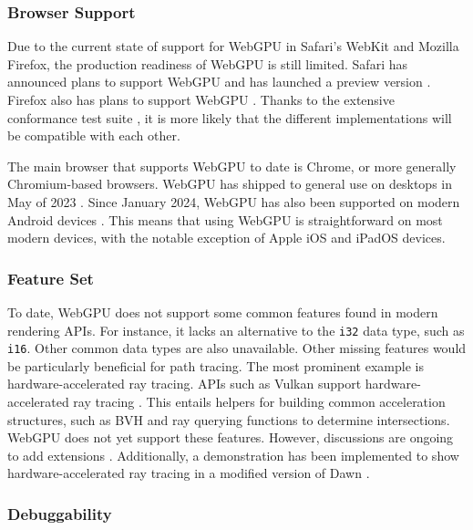 \subsubsection*{Browser Support}

Due to the current state of support for \gls{WebGPU} in Safari's \gls{WebKit} and Mozilla Firefox, the production readiness of \gls{WebGPU} is still limited. Safari has announced plans to support \gls{WebGPU} and has launched a preview version \cite{SafariWebGPUSupport}. Firefox also has plans to support \gls{WebGPU} \cite{FirefoxWebGPUSupport}. Thanks to the extensive conformance test suite \cite{WebGPUConformanceTestSuite}, it is more likely that the different implementations will be compatible with each other.

The main browser that supports \gls{WebGPU} to date is Chrome, or more generally \gls{Chromium}-based browsers. \gls{WebGPU} has shipped to general use on desktops in May of 2023 \cite{ChromeWebGPUSupport}. Since January 2024, \gls{WebGPU} has also been supported on modern Android devices \cite{ChromeAndroidWebGPUSupport}. This means that using \gls{WebGPU} is straightforward on most modern devices, with the notable exception of Apple iOS and iPadOS devices.

\subsubsection*{Feature Set}

To date, \gls{WebGPU} does not support some common features found in modern rendering \glspl{API}. For instance, it lacks an alternative to the \texttt{i32} data type, such as \texttt{i16}. Other common data types are also unavailable. Other missing features would be particularly beneficial for path tracing. The most prominent example is hardware-accelerated ray tracing. \glspl{API} such as \gls{Vulkan} support hardware-accelerated ray tracing \cite{vulkanRayTracing}. This entails helpers for building common acceleration structures, such as \gls{BVH} and ray querying functions to determine intersections. \gls{WebGPU} does not yet support these features. However, discussions are ongoing to add extensions \cite{webGPURayTracing}. Additionally, a demonstration has been implemented to show hardware-accelerated ray tracing in a modified version of \gls{Dawn} \cite{webGPURayTracingFork}.

\subsubsection*{Debuggability}

